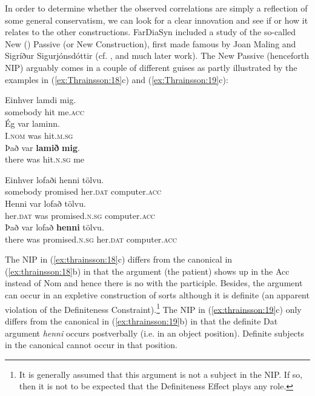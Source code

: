 \documentclass[output=paper]{LSP/langsci}
\begin{document}
In order to determine whether the observed correlations are simply a reflection of some general conservatism, we can look for a clear innovation and see if or how it relates to the other constructions. FarDiaSyn included a study of the so-called New () Passive (or New  Construction), first made famous by Joan Maling and Sigríður Sigurjónsdóttir (cf. \citealt{Sigurjónsdóttir2001}, \citealt{Maling2002} and much later work). The New  Passive (henceforth NIP) arguably comes in a couple of different guises as partly illustrated by the  examples in (\ref{ex:Thrainsson:18}c) and (\ref{ex:Thrainsson:19}c):

\ea%
\settowidth{}
    \label{ex:Thrainsson:18}\label{ex:thrainsson:18}
    \ea
    \gll Einhver     lamdi     mig.\\
	somebody  hit      me\textsc{.acc}\\
    \ex
	\gll     Ég        var      laminn.  \\
     I\textsc{.nom}      was    hit.\textsc{m.sg}\\
     \ex
     \gll Það      var      \textbf{lamið}    \textbf{mig}.\\
     there      was    hit.\textsc{n.sg}  me\\
    \z
\z


\ea%
\settowidth{}
    \label{ex:Thrainsson:19}\label{ex:thrainsson:19}
	\ea
    \gll Einhver    lofaði      henni      tölvu.\\
	somebody  promised    her\textsc{.dat}    computer\textsc{.acc}\\
    \ex
    \gll  Henni      var    lofað          tölvu.\\
    her\textsc{.dat}    was  promised\textsc{.n.sg}    computer\textsc{.acc}\\
    \ex
    \gll  Það      var    lofað           \textbf{henni}      tölvu. \\
    there      was  promised\textsc{.n.sg}    her\textsc{.dat}    computer\textsc{.acc}\\
    \z
\z

The NIP in (\ref{ex:thrainsson:18}c) differs from the canonical  in (\ref{ex:thrainsson:18}b) in that the argument (the patient) shows up in the Acc instead of Nom and hence there is no  with the participle. Besides, the argument can occur in an expletive construction of sorts although it is definite (an apparent violation of the Definiteness Constraint).\footnote{It is generally assumed that this argument is not a subject in the NIP. If so, then it is not to be expected that the Definiteness Effect plays any role.} The NIP in (\ref{ex:thrainsson:19}c) only differs from the canonical  in (\ref{ex:thrainsson:19}b) in that the definite Dat argument \textit{henni} occurs postverbally (i.e. in an object position). Definite subjects in the canonical  cannot occur in that position.
\end{document}
